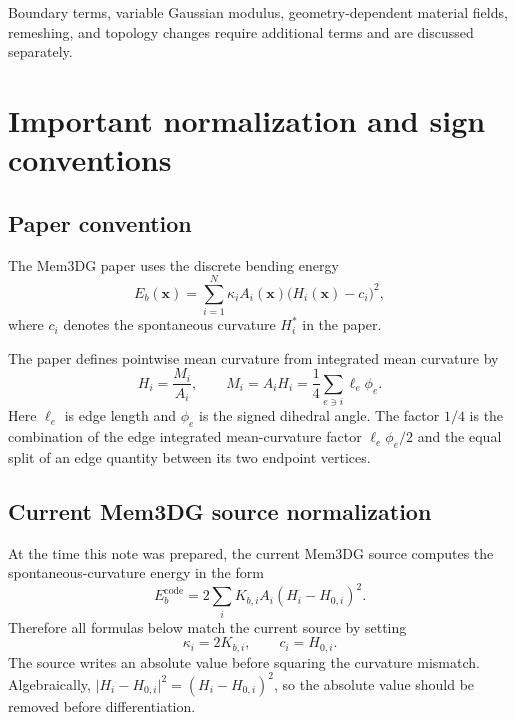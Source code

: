 \documentclass[11pt]{article}
\newcommand{\x}{\mathbf{x}}
\begin{document}
Boundary terms, variable Gaussian modulus, geometry-dependent material fields, remeshing, and topology changes require additional terms and are discussed separately.

\section{Important normalization and sign conventions}

\subsection{Paper convention}

The Mem3DG paper uses the discrete bending energy
\begin{equation}
  E_b(\x)
  =
  \sum_{i=1}^{N}
  \kappa_i A_i(\x)\bigl(H_i(\x)-c_i\bigr)^2,
  \label{eq:paper-energy}
\end{equation}
where $c_i$ denotes the spontaneous curvature $H_i^*$ in the paper.

The paper defines pointwise mean curvature from integrated mean curvature by
\begin{equation}
  H_i = \frac{M_i}{A_i},
  \qquad
  M_i = A_iH_i
      = \frac{1}{4}\sum_{e\ni i}\ell_e\phi_e.
  \label{eq:Hi-Mi}
\end{equation}
Here $\ell_e$ is edge length and $\phi_e$ is the signed dihedral angle.  The factor $1/4$ is the combination of the edge integrated mean-curvature factor $\ell_e\phi_e/2$ and the equal split of an edge quantity between its two endpoint vertices.

\subsection{Current Mem3DG source normalization}

At the time this note was prepared, the current Mem3DG source computes the spontaneous-curvature energy in the form
\begin{equation}
  E_b^{\mathrm{code}}
  =
  2\sum_i K_{b,i}A_i(H_i-H_{0,i})^2.
  \label{eq:code-energy}
\end{equation}
Therefore all formulas below match the current source by setting
\begin{equation}
  \boxed{\kappa_i = 2K_{b,i},\qquad c_i=H_{0,i}.}
  \label{eq:normalization-map}
\end{equation}
The source writes an absolute value before squaring the curvature mismatch.  Algebraically,
$\lvert H_i-H_{0,i}\rvert^2=(H_i-H_{0,i})^2$, so the absolute value should be removed before differentiation.
\end{document}
